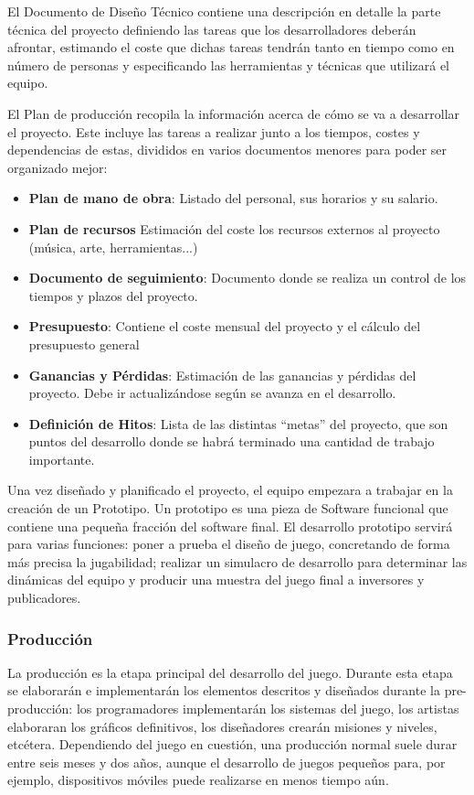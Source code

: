 El Documento de Diseño Técnico contiene una descripción en detalle la parte técnica del proyecto definiendo las tareas que los desarrolladores deberán afrontar, estimando el coste que dichas tareas tendrán tanto en tiempo como en número de personas y especificando las herramientas y técnicas que utilizará el equipo.

El Plan de producción recopila la información acerca de cómo se va a desarrollar el proyecto. Este incluye las tareas a realizar junto a los tiempos, costes y dependencias de estas, divididos en varios documentos menores para poder ser organizado mejor:
\begin{itemize}
\item \textbf{Plan de mano de obra}: Listado del personal, sus horarios y su salario.
\item \textbf{Plan de recursos} Estimación del coste los recursos externos al proyecto (música, arte, herramientas...)
\item \textbf{Documento de seguimiento}: Documento donde se realiza un control de los tiempos y plazos del proyecto.
\item \textbf{Presupuesto}: Contiene el coste mensual del proyecto y el cálculo del presupuesto general
\item \textbf{Ganancias y Pérdidas}: Estimación  de las ganancias y  pérdidas del proyecto. Debe ir actualizándose según se avanza en el desarrollo.
\item \textbf{Definición de Hitos}: Lista de las distintas ``metas'' del proyecto, que son puntos del desarrollo donde se habrá terminado una cantidad de trabajo importante.
\end{itemize}

Una vez diseñado y planificado el proyecto, el equipo empezara a trabajar en la creación de un Prototipo. Un prototipo es una pieza de Software funcional que contiene una pequeña fracción del software final. El desarrollo prototipo servirá para varias funciones: poner a prueba el diseño de juego, concretando de forma más precisa la jugabilidad; realizar un simulacro de desarrollo para determinar las dinámicas del equipo y producir una muestra del juego final a inversores y publicadores.

\subsubsection{Producción}
La producción es la etapa principal del desarrollo del juego. Durante esta etapa se elaborarán e implementarán los elementos descritos y diseñados durante la pre-producción: los programadores implementarán los sistemas del juego, los artistas elaboraran los gráficos definitivos, los diseñadores crearán misiones y niveles, etcétera. Dependiendo del juego en cuestión, una producción normal suele durar entre seis meses y dos años, aunque el desarrollo de juegos pequeños para, por ejemplo, dispositivos móviles puede realizarse en menos tiempo aún.

